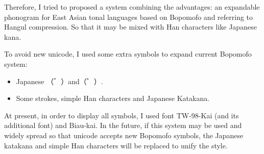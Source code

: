 Therefore, I tried to proposed a system combining the advantages: an expandable phonogram for East Asian tonal languages based on Bopomofo and referring to Hangul compression. So that it may be mixed with Han characters like Japanese kana. \par

To avoid new unicode, I used some extra symbols to expand current Bopomofo system: 
\begin{itemize}
	\item Japanese （゛）and（゜）. 
	\item Some strokes, simple Han characters and Japanese Katakana. 
\end{itemize}
At present, in order to display all symbols, I used font TW-98-Kai (and its additional font) and Biau-kai. In the future, if this system may be used and widely spread so that unicode accepts new Bopomofo symbols, the Japanese katakana and simple Han characters will be replaced to unify the style. \par
\clearpage